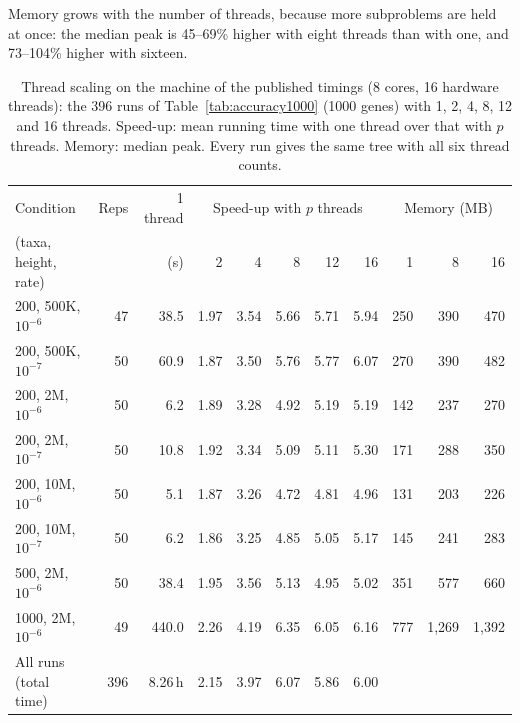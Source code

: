 \documentclass[11pt,a4paper]{article}
\begin{document}
Memory grows with the number of threads, because more subproblems are held at once: the median peak is
45--69\% higher with eight threads than with one, and 73--104\% higher with sixteen.

\begin{table}[t]
\centering\small
\caption{Thread scaling on the machine of the published timings (8 cores, 16 hardware threads): the
396 runs of Table~\ref{tab:accuracy1000} (1000 genes) with 1, 2, 4, 8, 12 and 16 threads. Speed-up:
mean running time with one thread over that with $p$ threads. Memory: median peak. Every run gives the
same tree with all six thread counts.}
\label{tab:threads}
\footnotesize\setlength{\tabcolsep}{4pt}
\begin{tabular}{lrrrrrrrrrr}
\toprule
Condition & Reps & 1 thread & \multicolumn{5}{c}{Speed-up with $p$ threads} & \multicolumn{3}{c}{Memory (MB)} \\
\cmidrule(lr){4-8}\cmidrule(lr){9-11}
(taxa, height, rate) & & (s) & 2 & 4 & 8 & 12 & 16 & 1 & 8 & 16 \\
\midrule
200, 500K, $10^{-6}$ & 47 & 38.5  & 1.97 & 3.54 & 5.66 & 5.71 & 5.94 & 250 & 390 & 470 \\
200, 500K, $10^{-7}$ & 50 & 60.9  & 1.87 & 3.50 & 5.76 & 5.77 & 6.07 & 270 & 390 & 482 \\
200, 2M, $10^{-6}$   & 50 & 6.2   & 1.89 & 3.28 & 4.92 & 5.19 & 5.19 & 142 & 237 & 270 \\
200, 2M, $10^{-7}$   & 50 & 10.8  & 1.92 & 3.34 & 5.09 & 5.11 & 5.30 & 171 & 288 & 350 \\
200, 10M, $10^{-6}$  & 50 & 5.1   & 1.87 & 3.26 & 4.72 & 4.81 & 4.96 & 131 & 203 & 226 \\
200, 10M, $10^{-7}$  & 50 & 6.2   & 1.86 & 3.25 & 4.85 & 5.05 & 5.17 & 145 & 241 & 283 \\
500, 2M, $10^{-6}$   & 50 & 38.4  & 1.95 & 3.56 & 5.13 & 4.95 & 5.02 & 351 & 577 & 660 \\
1000, 2M, $10^{-6}$  & 49 & 440.0 & 2.26 & 4.19 & 6.35 & 6.05 & 6.16 & 777 & 1{,}269 & 1{,}392 \\
\midrule
All runs (total time) & 396 & 8.26\,h & 2.15 & 3.97 & 6.07 & 5.86 & 6.00 & & & \\
\bottomrule
\end{tabular}
\end{table}
\end{document}
